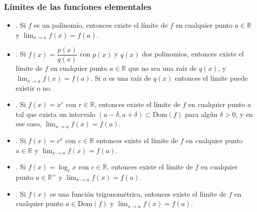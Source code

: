 \begin{frame}
\frametitle{Límites de las funciones elementales}
\begin{itemize}
\item {}. Si $f$ es un polinomio, entonces existe el límite de $f$ en cualquier
punto $a\in \mathbb{R}$ y $\lim_{x\rightarrow a}f(x)=f(a)$. 
\item {}. Si $f(x)=\dfrac{p(x)}{q(x)}$ con $p(x)$ y $q(x)$ dos polinomios,
entonces existe el límite de $f$ en cualquier punto $a\in \mathbb{R}$ que no sea una raíz de $q(x)$, y $\lim_{x\rightarrow a}f(x)=f(a)$. Si $a$ es una raíz de $q(x)$ entonces el límite puede existir o no.
\item {}. Si $f(x)=x^r$ con $r\in \mathbb{R}$, entonces existe el límite de $f$
en cualquier punto $a$ tal que exista un intervalo $(a-\delta,a+\delta)\subset \textrm{Dom}(f)$ para algún $\delta >0$, y en ese caso, $\lim_{x\rightarrow a}f(x)=f(a)$.
\item {}. Si $f(x)=c^x$ con $c\in \mathbb{R}$ entonces existe el límite de $f$
en cualquier punto $a\in \mathbb{R}$ y $\lim_{x\rightarrow a}f(x)=f(a)$.
\item {}. Si $f(x)=\log_cx$ con $c\in \mathbb{R}$, entonces existe el límite de
$f$ en cualquier  punto $a\in \mathbb{R}^+$ y $\lim_{x\rightarrow a}f(x)=f(a)$.
\item {}. Si $f(x)$ es una función trigonométrica, entonces existe el límite
de $f$ en cualquier punto $a\in \textrm{Dom}(f)$ y $\lim_{x\rightarrow a}f(x)=f(a)$.
\end{itemize}
\end{frame}



